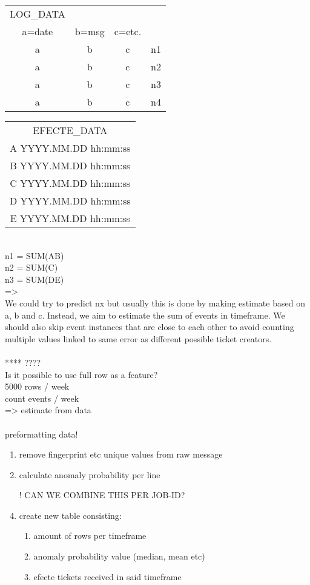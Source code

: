 \documentclass[english, 12pt, a4paper, elec, utf8, a-1b, online]{aaltothesis}
\begin{document}
\begin{tabular}{cccc}
  LOG\_DATA \\
  a=date & b=msg & c=etc. & \\
  a & b & c & n1 \\
  a & b & c & n2 \\
  a & b & c & n3 \\
  a & b & c & n4 \\
\end{tabular}
\begin{tabular}{c}
  EFECTE\_DATA \\
  A YYYY.MM.DD hh:mm:ss \\
  B YYYY.MM.DD hh:mm:ss \\
  C YYYY.MM.DD hh:mm:ss \\
  D YYYY.MM.DD hh:mm:ss \\
  E YYYY.MM.DD hh:mm:ss \\
\end{tabular}
\\
n1 = SUM(AB) \\
n2 = SUM(C) \\
n3 = SUM(DE) \\
=> \\
We could try to predict nx
but usually this is done
by making estimate based on
a, b and c.
Instead,
we aim to estimate the sum of events
in timeframe.
We should also skip event instances
that are close to each other
to avoid counting multiple values
linked to same error
as different possible ticket creators.
\\ \\
**** ???? \\
Is it possible to use full row as a feature? \\
5000 rows / week \\
count events / week \\
=> estimate from data \\
\\
preformatting data! \\
\begin{enumerate}
  \item remove fingerprint etc unique values from raw message
  \item calculate anomaly probability per line
  \item [!] CAN WE COMBINE THIS PER JOB-ID?
  \item create new table consisting:
  \begin{enumerate}
    \item amount of rows per timeframe
    \item anomaly probability value (median, mean etc)
    \item efecte tickets received in said timeframe
  \end{enumerate}
\end{enumerate}
\end{document}

